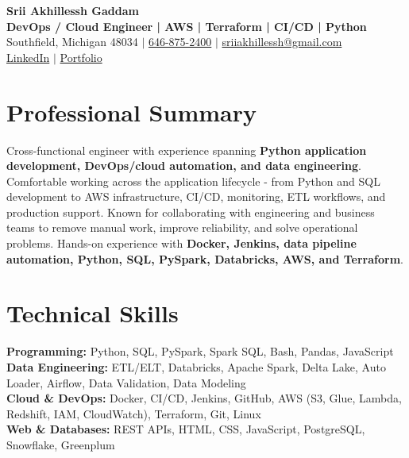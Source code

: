 \documentclass[letterpaper,10pt]{article}
\begin{document}
\fontsize{9.35pt}{10.45pt}\selectfont

\begin{center}
    {\LARGE \textbf{Srii Akhillessh Gaddam}} \\[-1pt]
    \textbf{DevOps / Cloud Engineer | AWS | Terraform | CI/CD | Python} \\[2pt]
    Southfield, Michigan 48034 $|$
    \href{tel:6468752400}{646-875-2400} $|$
    \href{mailto:sriiakhillessh@gmail.com}{sriiakhillessh@gmail.com} \\[1pt]
    \href{https://www.linkedin.com/in/srii-akhiilessh-gaddam-b48668191/}{LinkedIn} $|$
    \href{https://sriiakhillesshg.github.io/portfolio/}{Portfolio}
\end{center}
\vspace{-8pt}

\section{Professional Summary}
\small{Cross-functional engineer with experience spanning \textbf{Python application development, DevOps/cloud automation, and data engineering}. Comfortable working across the application lifecycle - from Python and SQL development to AWS infrastructure, CI/CD, monitoring, ETL workflows, and production support. Known for collaborating with engineering and business teams to remove manual work, improve reliability, and solve operational problems. Hands-on experience with \textbf{Docker, Jenkins, data pipeline automation, Python, SQL, PySpark, Databricks, AWS, and Terraform}.}

\section{Technical Skills}
\small{
\textbf{Programming:} Python, SQL, PySpark, Spark SQL, Bash, Pandas, JavaScript \\
\textbf{Data Engineering:} ETL/ELT, Databricks, Apache Spark, Delta Lake, Auto Loader, Airflow, Data Validation, Data Modeling \\
\textbf{Cloud \& DevOps:} Docker, CI/CD, Jenkins, GitHub, AWS (S3, Glue, Lambda, Redshift, IAM, CloudWatch), Terraform, Git, Linux \\
\textbf{Web \& Databases:} REST APIs, HTML, CSS, JavaScript, PostgreSQL, Snowflake, Greenplum
}
\end{document}
